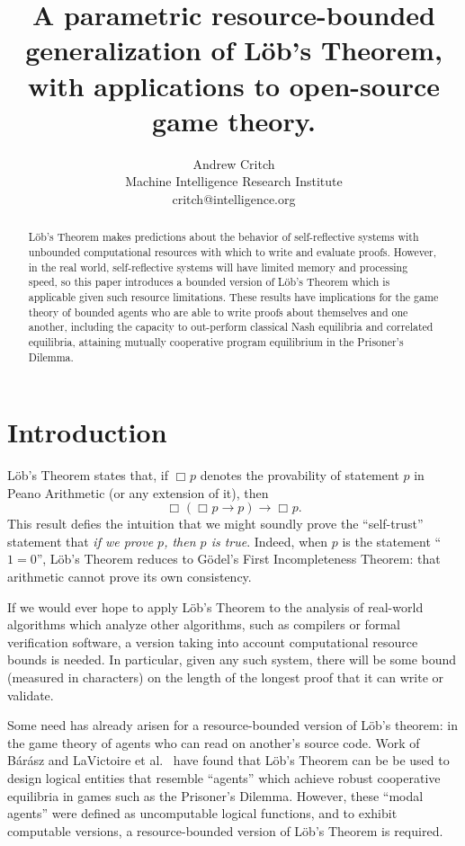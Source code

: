 \documentclass[onecolumn]{miri-tech-article}
\title{A parametric resource-bounded generalization of L\"{o}b's Theorem, with applications to open-source game theory.}
\author{Andrew Critch \\ Machine Intelligence Research Institute \\ critch@intelligence.org}
\numberwithin{equation}{section}
\theoremstyle{definition}
\newcommand{\bx}[1]{\Box_{#1}}
\renewcommand{\implies}{\rightarrow}
\renewcommand{\-}{^{-1}}
\begin{document}
\publishingnote{}

\maketitle

\begin{abstract}
L\"{o}b's Theorem makes predictions about the behavior of self-reflective systems with unbounded computational resources with which to write and evaluate proofs.  However, in the real world, self-reflective systems will have limited memory and processing speed, so this paper introduces a bounded version of L\"{o}b's Theorem which is applicable given such resource limitations.  
These results have implications for the game theory of bounded agents who are able to write proofs about themselves and one another, including the capacity to out-perform classical Nash equilibria and correlated equilibria, attaining mutually cooperative program equilibrium in the Prisoner's Dilemma.
\end{abstract}

\section{Introduction}\label{sec:bo}

L\"{o}b's Theorem states that, if $\bx{}p$ denotes the provability of statement $p$ in Peano Arithmetic (or any extension of it), then 
\[
\bx{}(\bx{}p \implies p) \implies \bx{}p.
\]
This result defies the intuition that we might soundly prove the ``self-trust'' statement that {\em if we prove $p$, then $p$ is true}.  Indeed, when $p$ is the statement ``$1=0$'', L\"{o}b's Theorem reduces to G\"{o}del's First Incompleteness Theorem: that arithmetic cannot prove its own consistency.

If we would ever hope to apply L\"{o}b's Theorem to the analysis of real-world algorithms which analyze other algorithms, such as compilers or formal verification software, a version taking into account computational resource bounds is needed.  In particular, given any such system, there will be some bound (measured in characters) on the length of the longest proof that it can write or validate.

Some need has already arisen for a resource-bounded version of L\"{o}b's theorem: in the game theory of agents who can read on another's source code.  Work of B\'{a}r\'{a}sz and LaVictoire et al.~\cite{Barasz:2014:RobustCooperation}\cite{LaVictoire:2014:PrisDilemmaLob} have found that L\"{o}b's Theorem can be be used to design logical entities that resemble ``agents'' which achieve robust cooperative equilibria in games such as the Prisoner's Dilemma.  However, these ``modal agents'' were defined as uncomputable logical functions, and to exhibit computable versions, a resource-bounded version of L\"{o}b's Theorem is required.
\end{document}
